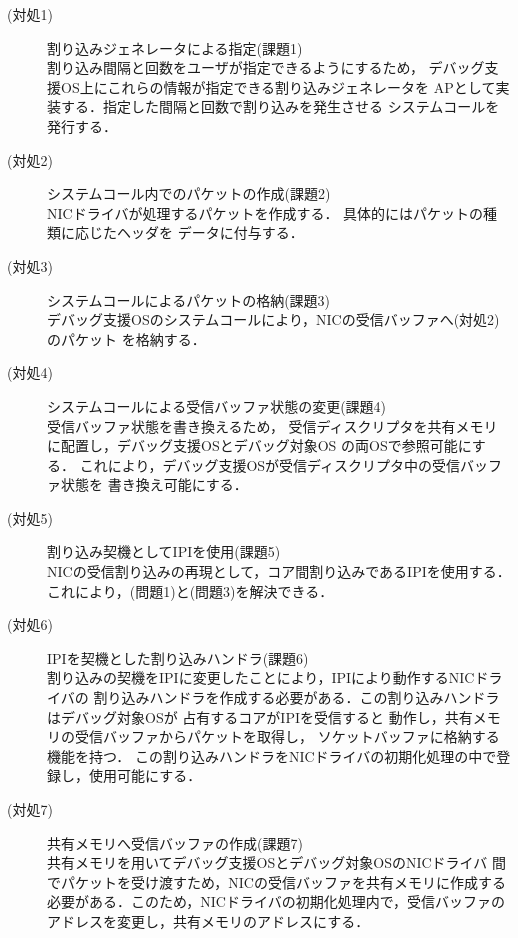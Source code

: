 \documentclass[submit,techreq,noauthor,dvipdfmx]{ipsj}
\begin{document}
\begin{description}
    \item[(対処1)] 割り込みジェネレータによる指定(課題1)\\
        割り込み間隔と回数をユーザが指定できるようにするため，
        デバッグ支援OS上にこれらの情報が指定できる割り込みジェネレータを
        APとして実装する．指定した間隔と回数で割り込みを発生させる
        システムコールを発行する．
    \item[(対処2)] システムコール内でのパケットの作成(課題2)\\
        NICドライバが処理するパケットを作成する．
        具体的にはパケットの種類に応じたヘッダを
        データに付与する．
    \item[(対処3)] システムコールによるパケットの格納(課題3)\\
        デバッグ支援OSのシステムコールにより，NICの受信バッファへ(対処2)のパケット
        を格納する．
    \item[(対処4)] システムコールによる受信バッファ状態の変更(課題4)\\
        受信バッファ状態を書き換えるため，
        受信ディスクリプタを共有メモリに配置し，デバッグ支援OSとデバッグ対象OS
        の両OSで参照可能にする．
        これにより，デバッグ支援OSが受信ディスクリプタ中の受信バッファ状態を
        書き換え可能にする．
    \item[(対処5)] 割り込み契機としてIPIを使用(課題5)\\
        NICの受信割り込みの再現として，コア間割り込みであるIPIを使用する．
        これにより，(問題1)と(問題3)を解決できる．
    \item[(対処6)] IPIを契機とした割り込みハンドラ(課題6)\\
        割り込みの契機をIPIに変更したことにより，IPIにより動作するNICドライバの
        割り込みハンドラを作成する必要がある．この割り込みハンドラはデバッグ対象OSが
        占有するコアがIPIを受信すると
        動作し，共有メモリの受信バッファからパケットを取得し，
        ソケットバッファに格納する機能を持つ．
        この割り込みハンドラをNICドライバの初期化処理の中で登録し，使用可能にする．
    \item[(対処7)] 共有メモリへ受信バッファの作成(課題7)\\
        共有メモリを用いてデバッグ支援OSとデバッグ対象OSのNICドライバ
        間でパケットを受け渡すため，NICの受信バッファを共有メモリに作成する
        必要がある．このため，NICドライバの初期化処理内で，受信バッファの
        アドレスを変更し，共有メモリのアドレスにする．
\end{description}
\end{document}
